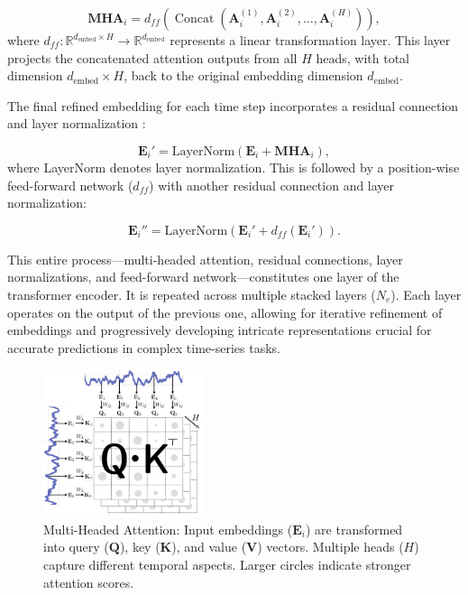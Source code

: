 \begin{equation}
    \mathbf{MHA}_i = d_{ff}(\operatorname{Concat}(\mathbf{A}_i^{(1)}, \mathbf{A}_i^{(2)}, \ldots, \mathbf{A}_i^{(H)})),
\end{equation}
where $d_{ff}: \mathbb{R}^{d_{\text{embed}} \times H} \rightarrow \mathbb{R}^{d_{\text{embed}}}$ represents a linear transformation layer. This layer projects the concatenated attention outputs from all $H$ heads, with total dimension $d_{\text{embed}} \times H$, back to the original embedding dimension $d_{\text{embed}}$.

The final refined embedding for each time step incorporates a residual connection \cite{he2016deep} and layer normalization \cite{lei2016layer}:

\begin{equation}
    \mathbf{E}_i' = \text{LayerNorm}(\mathbf{E}_i + \mathbf{MHA}_i),
\end{equation}
where LayerNorm denotes layer normalization. This is followed by a position-wise feed-forward network ($d_{ff}$) with another residual connection and layer normalization:

\begin{equation}
    \mathbf{E}_i'' = \text{LayerNorm}(\mathbf{E}_i' + d_{ff}(\mathbf{E}_i')).
\end{equation}

This entire process—multi-headed attention, residual connections, layer normalizations, and feed-forward network—constitutes one layer of the transformer encoder. It is repeated across multiple stacked layers ($N_e$). Each layer operates on the output of the previous one, allowing for iterative refinement of embeddings and progressively developing intricate representations crucial for accurate predictions in complex time-series tasks.

\begin{figure}
\centering
\includegraphics[width=0.42\textwidth]{img/attention_workings.pdf}
\caption{Multi-Headed Attention: Input embeddings ($\mathbf{E}_i$) are transformed into query ($\mathbf{Q}$), key ($\mathbf{K}$), and value ($\mathbf{V}$) vectors. Multiple heads ($H$) capture different temporal aspects. Larger circles indicate stronger attention scores.}
\label{fig:attention_workings}
\end{figure}

